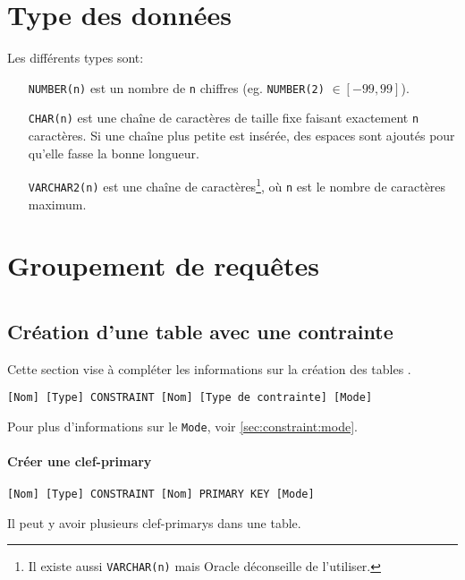 \documentclass[10pt,a4paper,french]{article}
\begin{document}
\section{Type des données}\label{sec:types}

Les différents types sont:
\begin{itemize}
\item[\tt NUMBER(n)] est un nombre de {\tt n} chiffres (eg. {\tt NUMBER(2)} $\in [-99,99]$).
\item[\tt CHAR(n)] est une chaîne de caractères de taille fixe faisant exactement {\tt n} caractères. Si une chaîne plus petite est insérée, des espaces sont ajoutés pour qu'elle fasse la bonne longueur.
\item[\tt VARCHAR2(n)] est une chaîne de caractères\footnote{Il existe aussi {\tt VARCHAR(n)} mais Oracle déconseille de l'utiliser.}, où {\tt n} est le nombre de caractères maximum.
\end{itemize}

\section{Groupement de requêtes}

\section{}\label{sec:constraint}

\subsection{Création d'une table avec une contrainte}\label{sec:constraint:add}

Cette section vise à compléter les informations sur la création des tables .
\begin{verbatim}
[Nom] [Type] CONSTRAINT [Nom] [Type de contrainte] [Mode]
\end{verbatim}
Pour plus d'informations sur le {\tt Mode}, voir \cref{sec:constraint:mode}.

\paragraph{Créer une \gls{clef-primary}}
\begin{verbatim}
[Nom] [Type] CONSTRAINT [Nom] PRIMARY KEY [Mode]
\end{verbatim}
Il peut y avoir plusieurs \glspl{clef-primary} dans une table.
\end{document}
